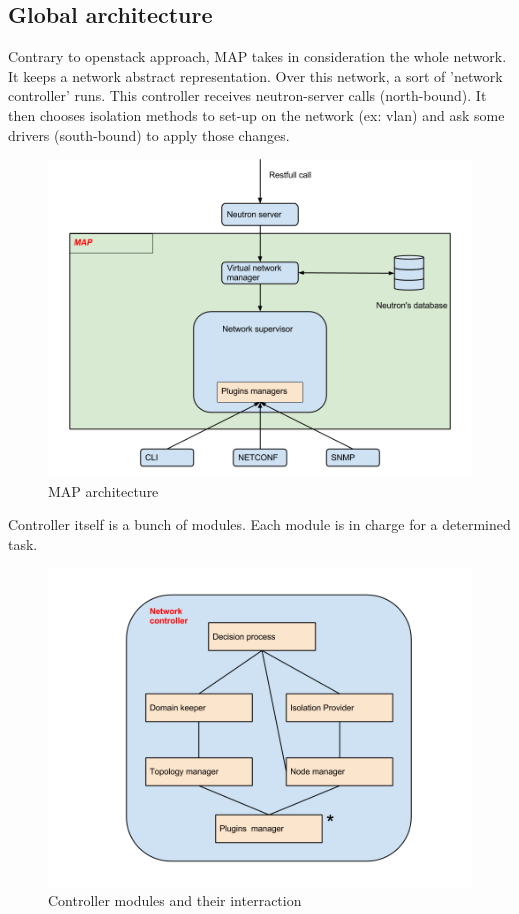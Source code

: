 \subsection{Global architecture}
Contrary to openstack approach, MAP takes in consideration the whole network. It
keeps a network abstract representation. Over this network, a sort of 'network
controller' runs. This controller receives neutron-server calls (north-bound).
It then chooses isolation methods to set-up on the network (ex: vlan) and ask
some drivers (south-bound) to apply those changes.
\begin{figure}
    \begin{center}
        \includegraphics[width=400pt]{img/MAP.png}
        \caption{MAP architecture}
    \end{center}
\end{figure}
Controller itself is a bunch of modules. Each module is in charge for a
determined task.
\begin{figure}
    \begin{center}
        \includegraphics[width=400pt]{img/controller.png}
        \caption{Controller modules and their interraction}
    \end{center}
\end{figure}


